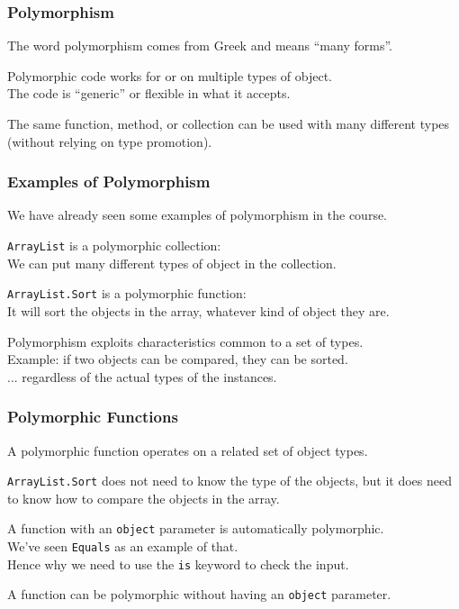 \begin{frame}
\frametitle{Polymorphism}
The word polymorphism comes from Greek and means ``many forms''.

Polymorphic code works for or on multiple types of object.\\
\quad The code is ``generic'' or flexible in what it accepts.

The same function, method, or collection can be used with many different types (without relying on type promotion).

\end{frame}


\begin{frame}
\frametitle{Examples of Polymorphism}

We have already seen some examples of polymorphism in the course.

\texttt{ArrayList} is a polymorphic collection:\\
\quad We can put many different types of object in the collection.

\texttt{ArrayList.Sort} is a polymorphic function:\\
\quad It will sort the objects in the array, whatever kind of object they are.



Polymorphism exploits characteristics common to a set of types.\\
\quad Example: if two objects can be compared, they can be sorted.\\
\quad ... regardless of the actual types of the instances.

\end{frame}


\begin{frame}
\frametitle{Polymorphic Functions}
A polymorphic function operates on a related set of object types.

\texttt{ArrayList.Sort} does not need to know the type of the objects, but it does need to know how to compare the objects in the array.

A function with an \texttt{object} parameter is automatically polymorphic.\\
\quad We've seen \texttt{Equals} as an example of that.\\
\quad Hence why we need to use the \texttt{is} keyword to check the input.

A function can be polymorphic without having an \texttt{object} parameter.\end{frame}


